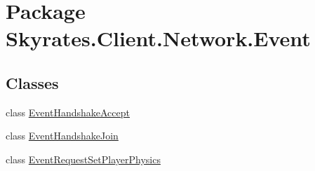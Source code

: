 \hypertarget{namespace_skyrates_1_1_client_1_1_network_1_1_event}{\section{Package Skyrates.\-Client.\-Network.\-Event}
\label{namespace_skyrates_1_1_client_1_1_network_1_1_event}
}
\subsection*{Classes}
\begin{DoxyCompactItemize}
\item 
class \hyperlink{class_skyrates_1_1_client_1_1_network_1_1_event_1_1_event_handshake_accept}{Event\-Handshake\-Accept}
\item 
class \hyperlink{class_skyrates_1_1_client_1_1_network_1_1_event_1_1_event_handshake_join}{Event\-Handshake\-Join}
\item 
class \hyperlink{class_skyrates_1_1_client_1_1_network_1_1_event_1_1_event_request_set_player_physics}{Event\-Request\-Set\-Player\-Physics}
\end{DoxyCompactItemize}
